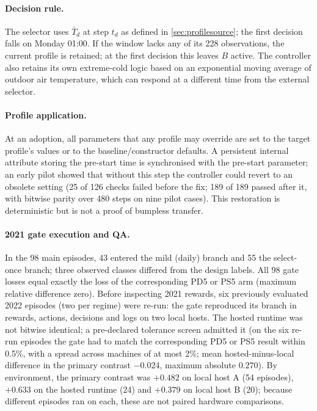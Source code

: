 \paragraph{Decision rule.}
The selector uses $\bar T_d$ at step $t_d$ as defined in \cref{sec:profilesource}; the first decision falls on Monday 01:00.
If the window lacks any of its 228 observations, the current profile is retained; at the first decision this leaves $B$
active. The controller also retains its own extreme-cold logic based on an exponential moving average of outdoor air
temperature, which can respond at a different time from the external selector.

\paragraph{Profile application.}
At an adoption, all parameters that any profile may override are set to the target profile's values or to the
baseline/constructor defaults. A persistent internal attribute storing the pre-start time is synchronised with the
pre-start parameter; an early pilot showed that without this step the controller could revert to an obsolete setting
(25 of 126 checks failed before the fix; 189 of 189 passed after it, with bitwise parity over 480 steps on nine pilot
cases). This restoration is deterministic but is not a proof of bumpless transfer.

\paragraph{2021 gate execution and QA.}
In the 98 main episodes, 43 entered the mild (daily) branch and 55 the select-once branch; three observed classes
differed from the design labels. All 98 gate losses equal exactly the loss of the corresponding PD5 or PS5 arm (maximum
relative difference zero). Before inspecting 2021 rewards, six previously evaluated 2022 episodes (two per regime) were re-run: the
gate reproduced its branch in rewards, actions, decisions and logs on two local hosts. The hosted runtime was not
bitwise identical; a pre-declared tolerance screen admitted it (on the six re-run episodes the gate had to match the corresponding
PD5 or PS5 result within 0.5\%, with a spread across machines of at most 2\%; mean hosted-minus-local difference in the
primary contrast $-0.024$\pp, maximum absolute $0.270$\pp). By environment, the primary contrast was $+0.482$\pp{} on local host A (54 episodes), $+0.633$\pp{} on the hosted runtime
(24) and $+0.379$\pp{} on local host B (20); because different episodes ran on each, these are not paired hardware comparisons.

